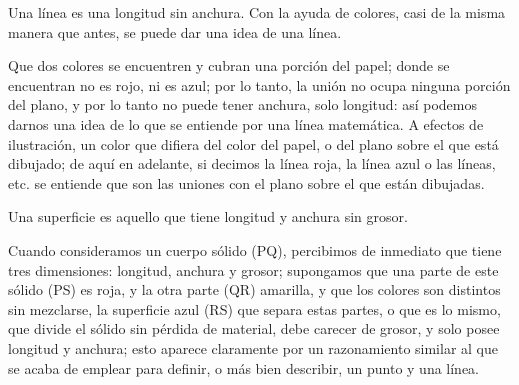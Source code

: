 \documentclass[booklanguage=english]{byrnebook}
\begin{document}
Una línea es una longitud sin anchura. Con la ayuda de colores, casi de la misma manera que antes, se puede dar una idea de una línea.

\drawCurrentPictureInMargin 

Que dos colores se encuentren y cubran una porción del papel; donde se encuentran no es rojo, ni es azul; por lo tanto, la unión no ocupa ninguna porción del plano, y por lo tanto no puede tener anchura, solo longitud: así podemos darnos una idea de lo que se entiende por una línea matemática. A efectos de ilustración, un color que difiera del color del papel, o del plano sobre el que está dibujado; de aquí en adelante, si decimos la línea roja, la línea azul o las líneas, etc. se entiende que son las uniones con el plano sobre el que están dibujadas.

Una superficie es aquello que tiene longitud y anchura sin grosor.

\drawCurrentPictureInMargin
Cuando consideramos un cuerpo sólido (PQ), percibimos de inmediato que tiene tres dimensiones: longitud, anchura y grosor; supongamos que una parte de este sólido (PS) es roja, y la otra parte (QR) amarilla, y que los colores son distintos sin mezclarse, la superficie azul (RS) que separa estas partes, o que es lo mismo, que divide el sólido sin pérdida de material, debe carecer de grosor, y solo posee longitud y anchura; esto aparece claramente por un razonamiento similar al que se acaba de emplear para definir, o más bien describir, un punto y una línea.
\end{document}
